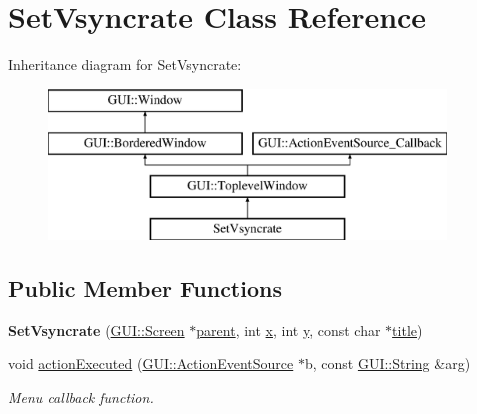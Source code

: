 \hypertarget{classSetVsyncrate}{\section{Set\-Vsyncrate Class Reference}
\label{classSetVsyncrate}
}
Inheritance diagram for Set\-Vsyncrate\-:\begin{figure}[H]
\begin{center}
\leavevmode
\includegraphics[height=4.000000cm]{classSetVsyncrate}
\end{center}
\end{figure}
\subsection*{Public Member Functions}
\begin{DoxyCompactItemize}
\item 
\hypertarget{classSetVsyncrate_a027bc635d352fdd95dfbcd6c8a6b6774}{{\bfseries Set\-Vsyncrate} (\hyperlink{classGUI_1_1Screen}{G\-U\-I\-::\-Screen} $\ast$\hyperlink{classGUI_1_1Window_a2e593ff65e7702178d82fe9010a0b539}{parent}, int \hyperlink{classGUI_1_1Window_a6ca6a80ca00c9e1d8ceea8d3d99a657d}{x}, int \hyperlink{classGUI_1_1Window_a0ee8e923aff2c3661fc2e17656d37adf}{y}, const char $\ast$\hyperlink{classGUI_1_1ToplevelWindow_a04de191f9a57b5b584657866a4ac6843}{title})}\label{classSetVsyncrate_a027bc635d352fdd95dfbcd6c8a6b6774}

\item 
\hypertarget{classSetVsyncrate_a7cb5a521b9e9c28bfc78d0820a2901a3}{void \hyperlink{classSetVsyncrate_a7cb5a521b9e9c28bfc78d0820a2901a3}{action\-Executed} (\hyperlink{classGUI_1_1ActionEventSource}{G\-U\-I\-::\-Action\-Event\-Source} $\ast$b, const \hyperlink{classGUI_1_1String}{G\-U\-I\-::\-String} \&arg)}\label{classSetVsyncrate_a7cb5a521b9e9c28bfc78d0820a2901a3}

\begin{DoxyCompactList}\small\item\em Menu callback function. \end{DoxyCompactList}\end{DoxyCompactItemize}
